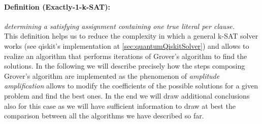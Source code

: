 \documentclass[english]{article}
\begin{document}
				\paragraph{Definition (Exactly-1-k-SAT):} \emph{determining a satisfying assignment containing one true literal per clause.} \\
				
				This definition helps us to reduce the complexity in which a general k-SAT solver works (see qiskit's implementation at \ref{sec:quantumQiskitSolver}) and allows to realize an algorithm that performs iterations of Grover's algorithm to find the solutions. In the following we will describe precisely how the steps composing Grover's algorithm are implemented as the phenomenon of \emph{amplitude amplification} allows to modify the coefficients of the possible solutions for a given problem and find the best ones. In the end we will draw additional conclusions also for this case as we will have sufficient information to draw at best the comparison between all the algorithms we have described so far. \\
				
\end{document}
